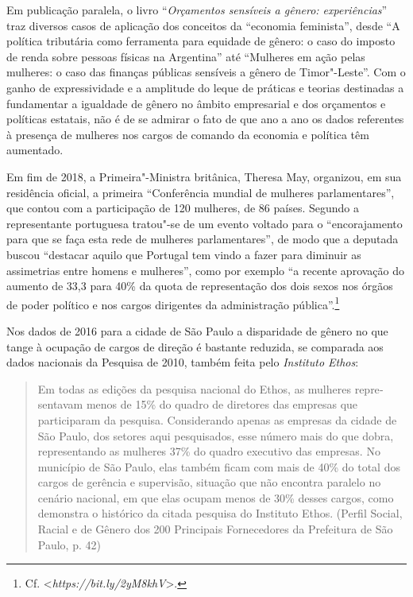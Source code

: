 Em publicação paralela, o livro ``\emph{Orçamentos sensíveis a gênero:
experiências}'' traz diversos casos de aplicação dos conceitos da
``economia feminista'', desde ``A política tributária como ferramenta
para equidade de gênero: o caso do imposto de renda sobre pessoas
físicas na Argentina'' até ``Mulheres em ação pelas mulheres: o caso das
finanças públicas sensíveis a gênero de Timor"-Leste''. Com o ganho de
expressividade e a amplitude do leque de práticas e teorias destinadas a
fundamentar a igualdade de gênero no âmbito empresarial e dos orçamentos
e políticas estatais, não é de se admirar o fato de que ano a ano os
dados referentes à presença de mulheres nos cargos de comando da
economia e política têm aumentado.

Em fim de 2018, a Primeira"-Ministra britânica, Theresa May, organizou,
em sua residência oficial, a primeira ``Conferência mundial de mulheres
parlamentares'', que contou com a participação de 120 mulheres, de 86
países. Segundo a representante portuguesa tratou"-se de um evento
voltado para o ``encorajamento para que se faça esta rede de mulheres
parlamentares'', de modo que a deputada buscou ``destacar aquilo que
Portugal tem vindo a fazer para diminuir as assimetrias entre homens e
mulheres'', como por exemplo ``a recente aprovação do aumento de 33,3
para 40\% da quota de representação dos dois sexos nos órgãos de poder
político e nos cargos dirigentes da administração pública''.\footnote{Cf.
  \textless{}\emph{https://bit.ly/2yM8khV}\textgreater{}.}

Nos dados de 2016 para a cidade de São Paulo a disparidade de gênero no
que tange à ocupação de cargos de direção é bastante reduzida, se
comparada aos dados nacionais da Pesquisa de 2010, também feita pelo
\emph{Instituto Ethos}:

\begin{quote}
Em todas as edições da pesquisa nacional do Ethos, as mulheres
repre­sentavam menos de 15\% do quadro de diretores das empresas que
participaram da pesquisa. Con­siderando apenas as empresas da cidade de
São Paulo, dos setores aqui pesquisados, esse número mais do que dobra,
representando as mulheres 37\% do quadro executivo das empresas. No
município de São Paulo, elas também ficam com mais de 40\% do total dos
cargos de ge­rência e supervisão, situação que não encontra paralelo no
cenário nacional, em que elas ocupam menos de 30\% desses cargos, como
de­monstra o histórico da citada pesquisa do Insti­tuto Ethos. (Perfil
Social, Racial e de Gênero dos 200 Principais Fornecedores da Prefeitura
de São Paulo, p. 42)
\end{quote}

